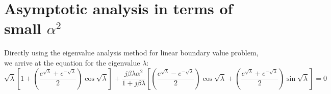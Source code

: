 \documentclass{article}
\begin{document}
\section{Asymptotic analysis in terms of small $\alpha^2$}
Directly using the eigenvalue analysis method for linear boundary value problem, we arrive at the equation for the eigenvalue $\lambda$:
\begin{equation}
    \sqrt{\lambda} \left[ 1 + \left( \frac{e^{\sqrt{\lambda}} + e^{-\sqrt{\lambda}} }{2} \right) \cos \sqrt{\lambda} \right] + \frac{j \beta \lambda \alpha^2}{1 + j \beta \lambda} \left[ \left( \frac{e^{\sqrt{\lambda}} - e^{-\sqrt{\lambda}} }{2} \right) \cos \sqrt{\lambda} + \left( \frac{e^{\sqrt{\lambda}} + e^{-\sqrt{\lambda}} }{2} \right) \sin \sqrt{\lambda} \right] = 0
\end{equation}
\end{document}
